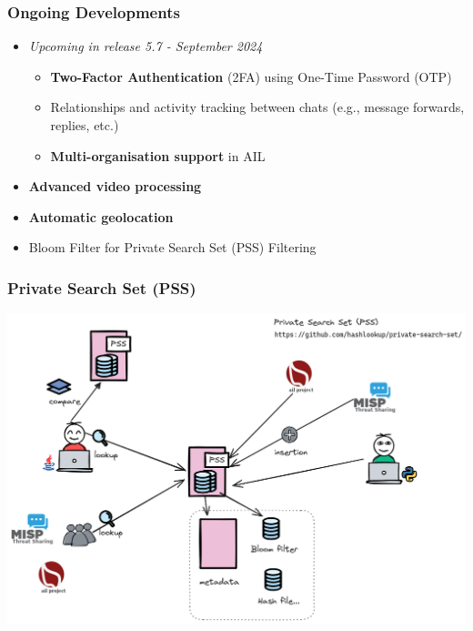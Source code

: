 \documentclass{beamer}
\begin{document}
\begin{frame}
    \frametitle{Ongoing Developments}
    \begin{itemize}
        \item \textit{Upcoming in release 5.7 - September 2024}
        \begin{itemize}
		\item {\bf Two-Factor Authentication} (2FA) using One-Time Password (OTP) \\
        \item Relationships and activity tracking between chats (e.g., message forwards, replies, etc.) \\
	\item {\bf Multi-organisation support} in AIL
	\end{itemize}
\item {\bf Advanced video processing}
\item {\bf Automatic geolocation}
        \item Bloom Filter for Private Search Set (PSS) Filtering
    \end{itemize}
\end{frame}

\begin{frame}
    \frametitle{Private Search Set (PSS)}
    \begin{center}
        \includegraphics[scale=0.27]{images/pss-overview.png}
    \end{center}
\end{frame}
\end{document}

